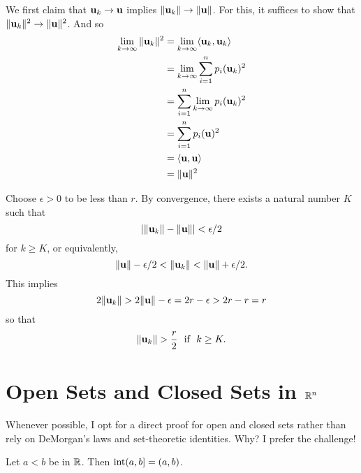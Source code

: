 \documentclass[letterpaper, twoside, 12pt]{book}
\begin{document}
\begin{solution}
    We first claim that \(\mathbf u_k \to \mathbf u\) implies 
    \(\|\mathbf u_k \| \to \|\mathbf u\|\). For this, it suffices to show that
    \( \|\mathbf u_k \|^2 \to \|\mathbf u \|^2\). And so
    \begin{align*}
        \lim_{k \to \infty} \|\mathbf u_k\|^2 &= \lim_{k \to \infty} \langle\mathbf u_k, \mathbf u_k \rangle \\
                                            &= \lim_{k \to \infty} \sum_{i = 1}^n p_i(\mathbf u_k)^2 \\
                                            &= \sum_{i = 1}^n \lim_{k \to \infty} p_i(\mathbf u_k)^2 \\
                                            &= \sum_{i = 1}^n p_i(\mathbf u)^2 \\
                                            &= \langle \mathbf u, \mathbf u \rangle \\
                                            &= \|\mathbf u\|^2 \\
    \end{align*}

    Choose \(\epsilon > 0\) to be less than \(r\). By convergence, there exists 
    a natural number \(K\) such that
    \[ | \|\mathbf u_k\| - \|\mathbf u\| | < \epsilon/2 \] 
    for \(k \geq K\), or equivalently, 
    \[ \|\mathbf u\| - \epsilon/2 < \|\mathbf u_k\| < \|\mathbf u\| + \epsilon/2 .\]
    This implies
    \[ 2 \|\mathbf u_k\| > 2\|\mathbf u\| - \epsilon = 2r - \epsilon > 2r - r = r \]
    so that
    \[ \|\mathbf u_k\| > \frac{r}{2} \text{~~if~~} k \geq K .\]
\end{solution}


\section{Open Sets and Closed Sets in \texorpdfstring{$\mathbb R^n$}{Rn}}

\begin{remark}
    Whenever possible, I opt for a direct proof for open and
    closed sets rather than rely on DeMorgan's laws and set-theoretic
    identities. Why? I prefer the challenge!
\end{remark}

\begin{example}[10.11]
  Let \(a<b\) be in \(\mathbb R\). Then \(\operatorname{int}(a,b]=(a,b)\).
\end{example}
\end{document}
